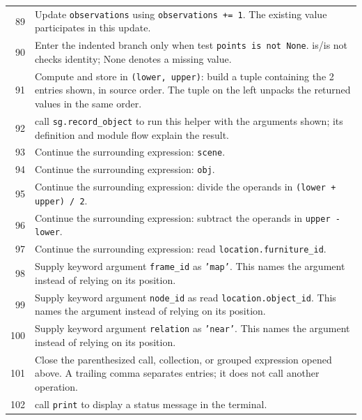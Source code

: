 \documentclass[11pt,a4paper]{book}
\begin{document}
\begin{longtable}{r p{}}
89 & Update \texttt{observations} using \texttt{observations += 1}. The existing value participates in this update. \\

90 & Enter the indented branch only when test \texttt{points is not None}. is/is not checks identity; None denotes a missing value. \\

91 & Compute and store in \texttt{(lower, upper)}: build a tuple containing the 2 entries shown, in source order. The tuple on the left unpacks the returned values in the same order. \\

92 & call \texttt{sg.record\_object} to run this helper with the arguments shown; its definition and module flow explain the result. \\

93 & Continue the surrounding expression: \texttt{scene}. \\

94 & Continue the surrounding expression: \texttt{obj}. \\

95 & Continue the surrounding expression: divide the operands in \texttt{(lower + upper) / 2}. \\

96 & Continue the surrounding expression: subtract the operands in \texttt{upper - lower}. \\

97 & Continue the surrounding expression: read \texttt{location.furniture\_id}. \\

98 & Supply keyword argument \texttt{frame\_id} as \texttt{'map'}. This names the argument instead of relying on its position. \\

99 & Supply keyword argument \texttt{node\_id} as read \texttt{location.object\_id}. This names the argument instead of relying on its position. \\

100 & Supply keyword argument \texttt{relation} as \texttt{'near'}. This names the argument instead of relying on its position. \\

101 & Close the parenthesized call, collection, or grouped expression opened above. A trailing comma separates entries; it does not call another operation. \\

102 & call \texttt{print} to display a status message in the terminal. \\


\end{longtable}
\end{document}
